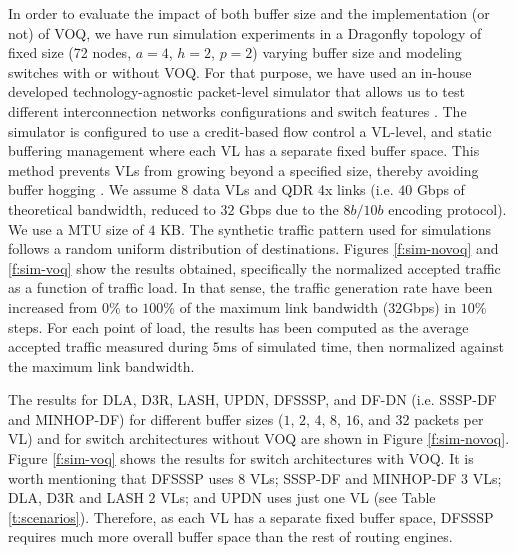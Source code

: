 \documentclass[review]{elsarticle}
\newcommand{\dfly}{Dragonfly}
\begin{document}
In order to evaluate the impact of both buffer size and the implementation (or not) of VOQ, we have run simulation experiments
in a \dfly{} topology of fixed size (72 nodes, $a=4$, $h=2$, $p=2$) varying buffer size and modeling switches with or without VOQ.
For that purpose, we have used an in-house developed technology-agnostic packet-level simulator that allows us to test different interconnection
networks configurations and switch features  \cite{yebenes13_sauron}.
The simulator is configured to use a credit-based flow control a VL-level, and static buffering management where each VL has a separate fixed buffer space.
This method prevents VLs from growing beyond a specified size, thereby avoiding buffer hogging \cite{yoshigoe_2007}.
We assume $8$ data VLs and QDR 4x links (i.e. $40$ Gbps of theoretical bandwidth, reduced to $32$ Gbps due to the $8b/10b$ encoding protocol).
We use a MTU size of $4$ KB.
The synthetic traffic pattern used for simulations follows a random uniform distribution of destinations.
Figures \ref{f:sim-novoq} and \ref{f:sim-voq} show the results obtained, specifically the normalized accepted traffic as a function of traffic load.
In that sense, the traffic generation rate have been increased from $0$\% to $100$\% of the maximum link bandwidth ($32$Gbps) in $10\%$ steps.
For each point of load, the results has been computed as the average accepted traffic measured during $5$ms of simulated time,
then normalized against the maximum link bandwidth.

The results for DLA, D3R, LASH, UPDN, DFSSSP, and DF-DN (i.e. SSSP-DF and MINHOP-DF)
for different buffer sizes ($1$, $2$, $4$, $8$, $16$, and $32$ packets per VL) and for switch architectures without VOQ are shown in Figure \ref{f:sim-novoq}.
Figure \ref{f:sim-voq} shows the results for switch architectures with VOQ.
It is worth mentioning that DFSSSP uses $8$ VLs; SSSP-DF and MINHOP-DF $3$ VLs;
DLA, D3R and LASH $2$ VLs; and UPDN uses just one VL (see Table \ref{t:scenarios}).
Therefore, as each VL has a separate fixed buffer space, DFSSSP requires much more overall buffer space than the rest of routing engines.
\end{document}
